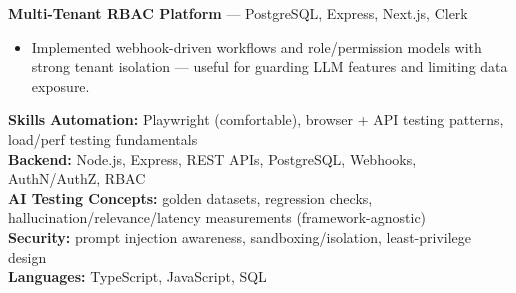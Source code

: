 \documentclass[10pt,a4paper]{article}
\begin{document}
\textbf{Multi-Tenant RBAC Platform} — PostgreSQL, Express, Next.js, Clerk\\
\begin{itemize}
  \item Implemented webhook-driven workflows and role/permission models with strong tenant isolation — useful for guarding LLM features and limiting data exposure.
\end{itemize}

\vspace{6pt}
{\large\bfseries Skills}
\vspace{2pt}
\textbf{Automation:} Playwright (comfortable), browser + API testing patterns, load/perf testing fundamentals\\
\textbf{Backend:} Node.js, Express, REST APIs, PostgreSQL, Webhooks, AuthN/AuthZ, RBAC\\
\textbf{AI Testing Concepts:} golden datasets, regression checks, hallucination/relevance/latency measurements (framework-agnostic)\\
\textbf{Security:} prompt injection awareness, sandboxing/isolation, least-privilege design\\
\textbf{Languages:} TypeScript, JavaScript, SQL
\end{document}
